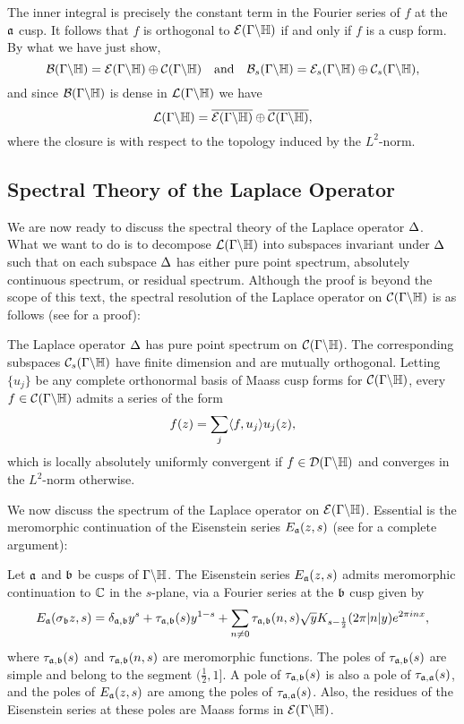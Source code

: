       The inner integral is precisely the constant term in the Fourier series of $f$ at the $\mathfrak{a}$ cusp. It follows that $f$ is orthogonal to $\mathcal{E}(\Gamma\backslash\mathbb{H})$ if and only if $f$ is a cusp form. By what we have just show,
      \[
        \mathcal{B}(\Gamma\backslash\mathbb{H}) = \mathcal{E}(\Gamma\backslash\mathbb{H}) \oplus \mathcal{C}(\Gamma\backslash\mathbb{H}) \quad \text{and} \quad \mathcal{B}_{s}(\Gamma\backslash\mathbb{H}) = \mathcal{E}_{s}(\Gamma\backslash\mathbb{H}) \oplus \mathcal{C}_{s}(\Gamma\backslash\mathbb{H}),
      \]
      and since $\mathcal{B}(\Gamma\backslash\mathbb{H})$ is dense in $\mathcal{L}(\Gamma\backslash\mathbb{H})$ we have
      \[
        \mathcal{L}(\Gamma\backslash\mathbb{H}) = \overline{\mathcal{E}(\Gamma\backslash\mathbb{H})} \oplus \overline{\mathcal{C}(\Gamma\backslash\mathbb{H})},
      \]
      where the closure is with respect to the topology induced by the $L^{2}$-norm.
    \subsection*{Spectral Theory of the Laplace Operator}
      We are now ready to discuss the spectral theory of the Laplace operator $\Delta$. What we want to do is to decompose $\mathcal{L}(\Gamma\backslash\mathbb{H})$ into subspaces invariant under $\Delta$ such that on each subspace $\Delta$ has either pure point spectrum, absolutely continuous spectrum, or residual spectrum. Although the proof is beyond the scope of this text, the spectral resolution of the Laplace operator on $\mathcal{C}(\Gamma\backslash\mathbb{H})$ is as follows (see \cite{iwaniec2021spectral} for a proof):

      \begin{theorem}\label{thm:cusp_form_spectrum}
        The Laplace operator $\Delta$ has pure point spectrum on $\mathcal{C}(\Gamma\backslash\mathbb{H})$. The corresponding subspaces $\mathcal{C}_{s}(\Gamma\backslash\mathbb{H})$ have finite dimension and are mutually orthogonal. Letting $\{u_{j}\}$ be any complete orthonormal basis of Maass cusp forms for $\mathcal{C}(\Gamma\backslash\mathbb{H})$, every $f \in \mathcal{C}(\Gamma\backslash\mathbb{H})$ admits a series of the form
        \[
          f(z) = \sum_{j}\langle f,u_{j}\rangle u_{j}(z),
        \]
        which is locally absolutely uniformly convergent if $f \in \mathcal{D}(\Gamma\backslash\mathbb{H})$ and converges in the $L^{2}$-norm otherwise.
      \end{theorem}

      We now discuss the spectrum of the Laplace operator on $\mathcal{E}(\Gamma\backslash\mathbb{H})$. Essential is the meromorphic continuation of the Eisenstein series $E_{\mathfrak{a}}(z,s)$ (see \cite{iwaniec2021spectral} for a complete argument):

      \begin{theorem}\label{thm:meromorphic_continuation_of_Eisenstein_series}
        Let $\mathfrak{a}$ and $\mathfrak{b}$ be cusps of $\Gamma\backslash\mathbb{H}$. The Eisenstein series $E_{\mathfrak{a}}(z,s)$ admits meromorphic continuation to $\mathbb{C}$ in the $s$-plane, via a Fourier series at the $\mathfrak{b}$ cusp given by
        \[
          E_{\mathfrak{a}}(\sigma_{\mathfrak{b}}z,s) = \delta_{\mathfrak{a},\mathfrak{b}}y^{s}+\tau_{\mathfrak{a},\mathfrak{b}}(s)y^{1-s}+\sum_{n \neq 0}\tau_{\mathfrak{a},\mathfrak{b}}(n,s)\sqrt{y}K_{s-\frac{1}{2}}(2\pi|n|y)e^{2\pi inx},
        \]
        where $\tau_{\mathfrak{a},\mathfrak{b}}(s)$ and $\tau_{\mathfrak{a},\mathfrak{b}}(n,s)$ are meromorphic functions. The poles of $\tau_{\mathfrak{a},\mathfrak{b}}(s)$ are simple and belong to the segment $(\frac{1}{2},1]$. A pole of $\tau_{\mathfrak{a},\mathfrak{b}}(s)$ is also a pole of $\tau_{\mathfrak{a},\mathfrak{a}}(s)$, and the poles of $E_{\mathfrak{a}}(z,s)$ are among the poles of $\tau_{\mathfrak{a},\mathfrak{a}}(s)$. Also, the residues of the Eisenstein series at these poles are Maass forms in $\mathcal{E}(\Gamma\backslash\mathbb{H})$.
      \end{theorem}

